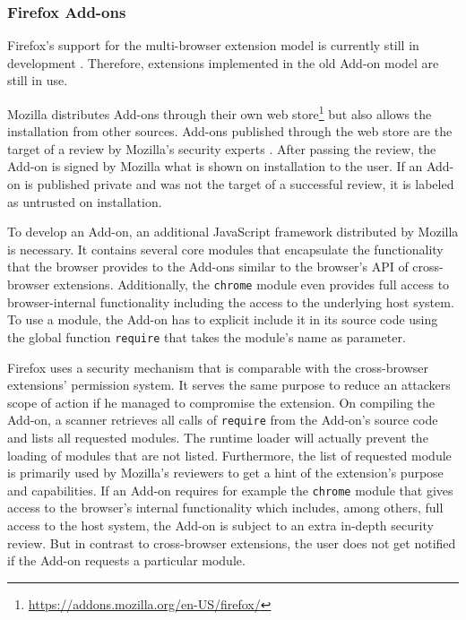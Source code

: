 \subsubsection{Firefox Add-ons}
	
	Firefox's support for the multi-browser extension model is currently still in development \cite{mozillaWebExtensionStatus}. Therefore, extensions implemented in the old Add-on model are still in use. 
	
	Mozilla distributes Add-ons through their own web store\footnote{\url{https://addons.mozilla.org/en-US/firefox/}} but also allows the installation from other sources. Add-ons published through the web store are the target of a review by Mozilla's security experts \cite{mozillaDevReviewPolicy}. After passing the review, the Add-on is signed by Mozilla what is shown on installation to the user. If an Add-on is published private and was not the target of a successful review, it is labeled as untrusted on installation. 
	
	To develop an Add-on, an additional JavaScript framework distributed by Mozilla is necessary. It contains several core modules that encapsulate the functionality that the browser provides to the Add-ons similar to the browser's API of cross-browser extensions. Additionally, the \texttt{chrome} module even provides full access to browser-internal functionality including the access to the underlying host system. To use a module, the Add-on has to explicit include it in its source code using the global function \texttt{require} that takes the module's name as parameter. 
	
	Firefox uses a security mechanism that is comparable with the cross-browser extensions' permission system. It serves the same purpose to reduce an attackers scope of action if he managed to compromise the extension. On compiling the Add-on, a scanner retrieves all calls of \texttt{require} from the Add-on's source code and lists all requested modules. The runtime loader will actually prevent the loading of modules that are not listed. Furthermore, the list of requested module is primarily used by Mozilla's reviewers to get a hint of the extension's purpose and capabilities. If an Add-on requires for example the \texttt{chrome} module that gives access to the browser's internal functionality which includes, among others, full access to the host system, the Add-on is subject to an extra in-depth security review. But in contrast to cross-browser extensions, the user does not get notified if the Add-on requests a particular module.
	
